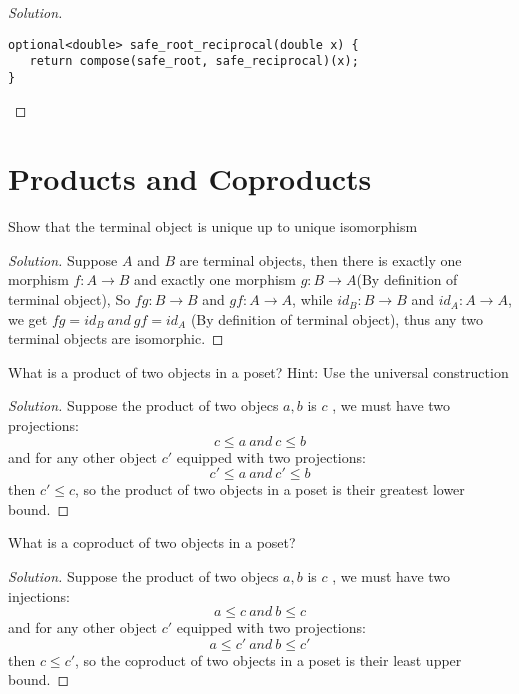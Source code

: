 \documentclass[7x10,thmnumcontwithchapter,WebLink,AddlevelTwoTOC,NumRef,BookEndNote,printer]{pupbook}
\begin{document}
\begin{proof}[Solution]
~\\
\begin{lstlisting}
optional<double> safe_root_reciprocal(double x) {
   return compose(safe_root, safe_reciprocal)(x);
}
\end{lstlisting}
\end{proof}


\chapter[Products and Coproducts]{Products and Coproducts\thefootnote}

\begin{exercise}
Show that the terminal object is unique up to unique isomorphism
\end{exercise}

\begin{proof}[Solution]
Suppose $A$ and $B$ are terminal objects, then there is exactly one morphism $f:A \rightarrow B$ and exactly one morphism $g: B \rightarrow A$(By definition of terminal object), So $fg: B \rightarrow B$ and  $gf: A \rightarrow A$, while $id_B: B \rightarrow B$ and  $id_A: A \rightarrow A$, we get $fg = id_B \ and \ gf = id_A$ (By definition of terminal object), thus any two terminal objects are isomorphic.
\end{proof}

\begin{exercise}
What is a product of two objects in a poset? Hint: Use the universal construction
\end{exercise}


\begin{proof}[Solution]
Suppose the product of two objecs $a, b$ is $c$  , we must have two projections:  
       $$ c \leq a \ and \  c \leq b $$
and for any other object $c'$ equipped with two projections:
       $$ c' \leq a \ and \  c' \leq b $$
then $c' \leq c$,  so the product of two objects in a poset is their greatest lower bound.
\end{proof}


\begin{exercise}
What is a coproduct of two objects in a poset?
\end{exercise}


\begin{proof}[Solution]
Suppose the product of two objecs $a, b$ is $c$  , we must have two injections:  
   $$ a \leq c \ and \  b \leq c $$
and for any other object $c'$ equipped with two projections:
   $$  a \leq c' \ and \  b \leq c' $$
then $c \leq c'$,  so the coproduct of two objects in a poset is their least upper bound.
\end{proof}
\end{document}
